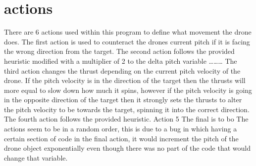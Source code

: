 \section{actions}
There are 6 actions used within this program to define what movement the drone does.
The first action is used to counteract the drones current pitch if it is facing the wrong direction from the target. 
The second action follows the provided heuristic modified with a multiplier of 2 to the delta pitch variable ………
The third action changes the thrust depending on the current pitch velocity of the drone. If the pitch velocity is in the direction of the target then the thrusts will more equal to slow down how much it spins, however if the pitch velocity is going in the opposite direction of the target then it strongly sets the thrusts to alter the pitch velocity to be towards the target, spinning it into the correct direction.
The fourth action follows the provided heuristic.
Action 5
The final is to bo
The actions seem to be in a random order, this is due to a bug in which having a certain section of code in the final action, it would increment the pitch of the drone object exponentially even though there was no part of the code that would change that variable.
